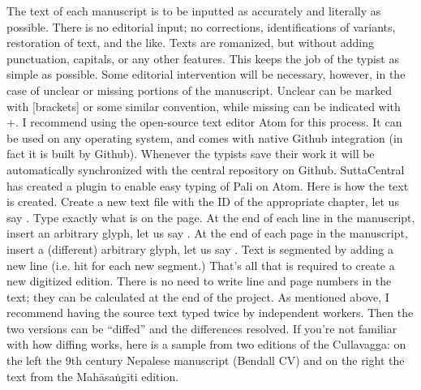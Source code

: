 {}\markdownRendererInterblockSeparator
{}The text of each manuscript is to be inputted as accurately and literally as possible. There is no editorial input; no corrections, identifications of variants, restoration of text, and the like. Texts are romanized, but without adding punctuation, capitals, or any other features. This keeps the job of the typist as simple as possible.\markdownRendererInterblockSeparator
{}Some editorial intervention will be necessary, however, in the case of unclear or missing portions of the manuscript. Unclear  can be marked with [brackets] or some similar convention, while missing  can be indicated with +.\markdownRendererInterblockSeparator
{}I recommend using the open-source text editor Atom for this process. It can be used on any operating system, and comes with native Github integration (in fact it is built by Github). Whenever the typists save their work it will be automatically synchronized with the central repository on Github. SuttaCentral has created a plugin to enable easy typing of Pali on Atom.\markdownRendererInterblockSeparator
{}Here is how the text is created.\markdownRendererInterblockSeparator
{}\markdownRendererOlBegin
{}Create a new text file with the ID of the appropriate chapter, let us say .\markdownRendererOlItemEnd 
{}Type exactly what is on the page.\markdownRendererOlItemEnd 
{}At the end of each line in the manuscript, insert an arbitrary glyph, let us say \markdownRendererCodeSpan{\markdownRendererDollarSign{}}.\markdownRendererOlItemEnd 
{}At the end of each page in the manuscript, insert a (different) arbitrary glyph, let us say \markdownRendererCodeSpan{\markdownRendererHash{}}.\markdownRendererOlItemEnd 
{}Text is segmented by adding a new line (i.e. hit  for each new segment.)\markdownRendererOlItemEnd 
\markdownRendererOlEnd \markdownRendererInterblockSeparator
{}That’s all that is required to create a new digitized edition. There is no need to write line and page numbers in the text; they can be calculated at the end of the project.\markdownRendererInterblockSeparator
{}As mentioned above, I recommend having the source text typed twice by independent workers. Then the two versions can be “diffed” and the differences resolved. If you’re not familiar with how diffing works, here is a sample from two editions of the Cullavagga: on the left the 9th century Nepalese manuscript (Bendall CV) and on the right the text from the Mahāsaṅgīti edition.\markdownRendererInterblockSeparator
